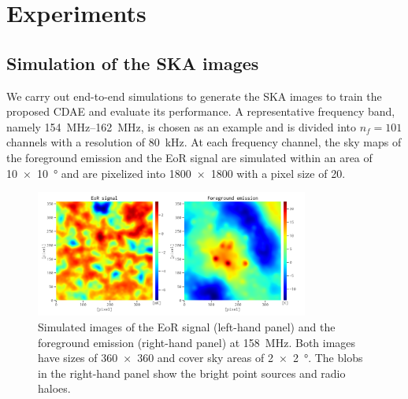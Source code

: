 \documentclass[fleqn,usenatbib]{mnras}
\begin{document}
\section{Experiments}
\label{sec:experiments}

\subsection{Simulation of the SKA images}
\label{sec:simulation}

We carry out end-to-end simulations to generate the SKA images to
train the proposed CDAE and evaluate its performance.
A representative frequency band, namely \SIrange{154}{162}{\MHz}, is chosen
as an example \citep[e.g.,][]{datta2010} and is divided into $n_f = 101$
channels with a resolution of \SI{80}{\kHz}.
At each frequency channel, the sky maps of the foreground emission and the
EoR signal are simulated within an area of \SI{10 x 10}{\degree} and are
pixelized into \num{1800 x 1800} with a pixel size of \SI{20}{\arcsec}.

\begin{figure}
  \centering
  \includegraphics[width=0.8\textwidth]{obsimg-158}
  \caption{\label{fig:obsimg}%
    Simulated images of the EoR signal (left-hand panel) and the foreground
    emission (right-hand panel) at \SI{158}{\MHz}.
    Both images have sizes of \num{360 x 360} and cover sky areas of
    \SI{2 x 2}{\degree}.
    The blobs in the right-hand panel show the bright point sources and
    radio haloes.
  }
\end{figure}
\end{document}
